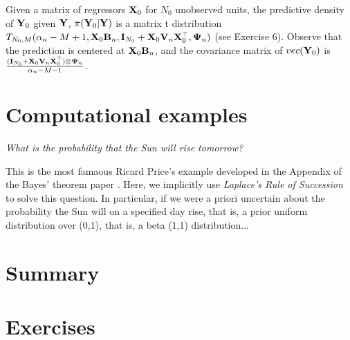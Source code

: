 Given a matrix of regressors ${\bf{X}}_0$ for $N_0$ unobserved units, the predictive density of ${\bf{Y}}_0$ given ${\bf{Y}}$, $\pi({\bf{Y}}_0|{\bf{Y}})$ is a matrix t distribution $T_{N_0,M}(\alpha_n-M+1,{\bf{X}}_0{\bf{B}}_n,{\bf{I}}_{N_0}+{\bf{X}}_0{\bf{V}}_n{\bf{X}}_0^{\top},{\bf{\Psi}}_n)$ (see Exercise 6). Observe that the prediction is centered at ${\bf{X}}_0{\bf{B}}_n$, and the covariance matrix of $vec({\bf{Y}}_0)$ is $\frac{({\bf{I}}_{N_0}+{\bf{X}}_0{\bf{V}}_n{\bf{X}}_0^{\top})\otimes{\bf{\Psi}}_n}{\alpha_n-M-1}$.  

\section{Computational examples}\label{sec35}

\textit{What is the probability that the Sun will rise tomorrow?}

This is the most famaous Ricard Price's example developed in the Appendix of the Bayes' theorem paper \cite{bayes1763lii}. Here, we implicitly use \textit{Laplace's Rule of Succession} to solve this question. In particular, if we were a priori uncertain about the probability the Sun will on a specified day rise, that is, a prior uniform distribution over (0,1), that is, a beta (1,1) distribution...


\section{Summary}\label{sec36}

\section{Exercises}\label{sec47}

